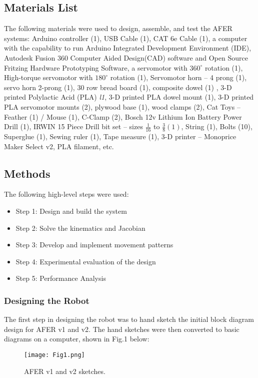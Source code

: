 \subsection{Materials List}
The following materials were used to design, assemble, and test the AFER systems: Arduino controller (1), USB Cable (1), CAT 6e Cable (1), a computer with the capability to run Arduino Integrated Development Environment (IDE), Autodesk Fusion 360 Computer Aided Design(CAD) software and Open Source Fritzing Hardware Prototyping Software, a servomotor with $360^{\circ}$ rotation (1), High-torque servomotor with $180^{\circ}$ rotation (1), Servomotor horn – 4 prong (1), servo horn 2-prong (1), 30 row bread board (1), composite dowel (1) , 3-D printed Polylactic Acid (PLA) \textit{l1}, 3-D printed PLA dowel mount (1), 3-D printed PLA servomotor mounts (2), plywood base (1), wood clamps (2), Cat Toys – Feather (1) / Mouse (1), C-Clamp (2), Bosch 12v Lithium Ion Battery Power Drill (1), IRWIN 15 Piece Drill bit set – sizes $\frac{1}{16}$ to $\frac{3}{8} (1)$, String (1), Bolts (10), Superglue (1), Sewing ruler (1), Tape measure (1), 3-D printer – Monoprice Maker Select v2, PLA filament, etc. 

\subsection{Methods}
The following high-level steps were used:
\begin{itemize}
\item Step 1: Design and build the system
\item Step 2: Solve the kinematics and Jacobian
\item Step 3: Develop and implement movement patterns
\item Step 4: Experimental evaluation of the design
\item Step 5: Performance Analysis
\end{itemize}

\subsubsection {Designing the Robot}
The first step in designing the robot was to hand sketch the initial block diagram design for AFER v1 and v2. The hand sketches were then converted to basic diagrams on a computer, shown in Fig.1 below:

\begin{figure}[h!]
\texttt{[image: Fig1.png]}
\caption{AFER v1 and v2 sketches.}
\label{1}
\end{figure}


